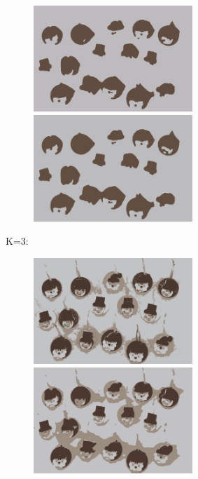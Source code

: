 \begin{center}
\begin{figure}[H]
\centering\includegraphics[width=6cm]{./imgkmeanscluster02-04.png}
\centering\includegraphics[width=6cm]{./imgkmeanscluster02-05.png}\\
\end{figure}
\end{center}
K=3:\\
\begin{center}
\begin{figure}[H]
\centering\includegraphics[width=6cm]{./imgkmeanscluster03-00.png}
\centering\includegraphics[width=6cm]{./imgkmeanscluster03-01.png}\\
\end{figure}
\end{center}
